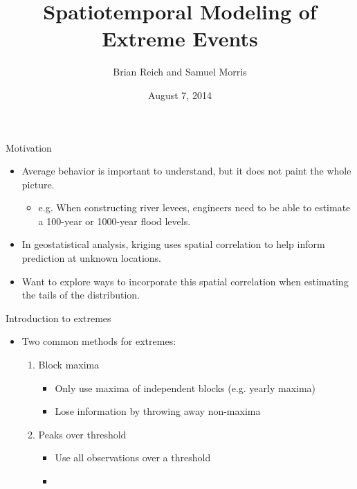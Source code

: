 \documentclass[t]{beamer}
\title[Spatiotemporal Modeling of Extreme Events] %
{
  Spatiotemporal Modeling of Extreme Events
}
\author[B. Reich and S. Morris]{Brian Reich and Samuel Morris}
\institute[NCSU]{North Carolina State University}
\date{August 7, 2014}
\begin{document}
\begin{frame}
\begin{center}
  \titlepage
\end{center}
\end{frame}

\begin{frame}{Motivation}
  \begin{itemize}
    \item Average behavior is important to understand, but it does not paint the whole picture.
    \begin{itemize}
      \item e.g. When constructing river levees, engineers need to be able to estimate a 100-year or 1000-year flood levels.
    \end{itemize}
    \item In geostatistical analysis, kriging uses spatial correlation to help inform prediction at unknown locations.
    \item Want to explore ways to incorporate this spatial correlation when estimating the tails of the distribution.
  \end{itemize}
\end{frame}

\begin{frame}{Introduction to extremes}
  \begin{itemize} \itemsep 1.5em
  \item Two common methods for extremes:
  \begin{enumerate}[1]
    \item Block maxima
    \begin{itemize}
      \item Only use maxima of independent blocks (e.g. yearly maxima)
      \item Lose information by throwing away non-maxima
    \end{itemize}
    \item Peaks over threshold
    \begin{itemize}
      \item Use all observations over a threshold
      \item
    \end{itemize}
  \end{enumerate}

  \end{itemize}
\end{frame}
\end{document}
